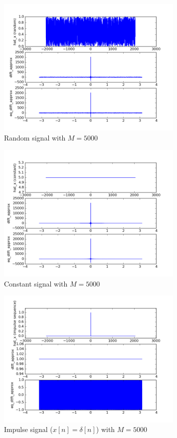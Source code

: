 \begin{figure}[htbp]
	\centering
	\includegraphics[width=0.8\textwidth]{images/p6-1-5000}
	\caption{Random signal with $M=5000$}
	\label{fig:p6-1-5000}
\end{figure}

\begin{figure}[htbp]
	\centering
	\includegraphics[width=0.8\textwidth]{images/p6-2-5000}
	\caption{Constant signal with $M=5000$}
	\label{fig:p6-2-5000}
\end{figure}

\begin{figure}[htbp]
	\centering
	\includegraphics[width=0.8\textwidth]{images/p6-3-5000}
	\caption{Impulse signal ($x[n] = \delta[n]$) with $M=5000$}
	\label{fig:p6-3-5000}
\end{figure}

